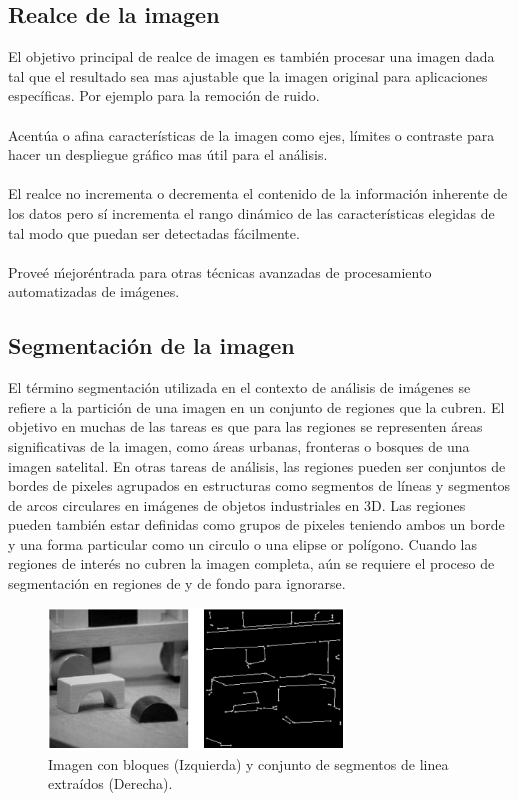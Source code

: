         \subsection{Realce de la imagen}
            El objetivo principal de realce de imagen es también procesar una imagen dada tal que el resultado sea mas ajustable que la imagen original para aplicaciones específicas. Por ejemplo para la remoción de ruido.
            \\\\%
            Acentúa o afina características de la imagen como ejes, límites o contraste para hacer un despliegue gráfico mas útil para el análisis.
            \\\\%
            El realce no incrementa o decrementa el contenido de la información inherente de los datos pero sí incrementa el rango dinámico de las características elegidas de tal modo que puedan ser detectadas fácilmente.
            \\\\%
            Proveé \'mejor\' entrada para otras técnicas avanzadas de procesamiento automatizadas de imágenes.
                        
        \subsection{Segmentación de la imagen}
            El término segmentación utilizada en el contexto de análisis de imágenes se refiere a la partición de una imagen en un conjunto de regiones que la cubren. El objetivo en muchas de las tareas es que para las regiones se representen áreas significativas de la imagen, como áreas urbanas, fronteras o bosques de una imagen satelital. En otras tareas de análisis, las regiones pueden ser conjuntos de bordes de pixeles agrupados en estructuras como segmentos de líneas y segmentos de arcos circulares en imágenes de objetos industriales en 3D. Las regiones pueden también estar definidas como grupos de pixeles teniendo ambos un borde y una forma particular como un circulo o una elipse or polígono. Cuando las regiones de interés no cubren la imagen completa, aún se requiere el proceso de segmentación en regiones de y de fondo para ignorarse. 
            \cite{imgAnalySeg}
            \begin{figure}[H]
                \centering
                \includegraphics[width=0.7\textwidth]{capitulo2/images/segmentation.PNG}
                \caption{Imagen con bloques (Izquierda) y conjunto de segmentos de linea extraídos (Derecha).}
                \label{fig:segmentacion}
            \end{figure}
